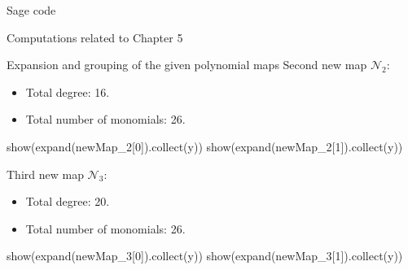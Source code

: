 \documentclass[11pt, a4paper, english, twoside, notitlepage, openright]{report}
\begin{document}
\begin{chapter}{Sage code}
\begin{section}{Computations related to Chapter 5}
\begin{subsection}{Expansion and grouping of the given polynomial maps}
Second new map $\mathcal{N}_2$:
\begin{itemize}
\item Total degree: 16.
\item Total number of monomials: 26.
\end{itemize}
\begin{sage}
show(expand(newMap_2[0]).collect(y))
show(expand(newMap_2[1]).collect(y))
\end{sage}

Third new map $\mathcal{N}_3$:
\begin{itemize}
\item Total degree: 20.
\item Total number of monomials: 26.
\end{itemize}
\begin{sage}
show(expand(newMap_3[0]).collect(y))
show(expand(newMap_3[1]).collect(y))
\end{sage}
\end{subsection}
\end{section}

\end{chapter}
\end{document}

